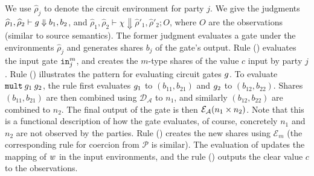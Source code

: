 We use $\widehat\rho_j$ to denote the circuit environment for party $j.$ 
We give the 
judgments $\widehat{\rho}_{1}, \widehat{\rho}_{2} \vdash {g}
\Downarrow b_{1}, b_{2}$, and $\widehat{\rho}_{1}, \widehat{\rho}_{2}
\vdash \chi \Downarrow \widehat{\rho}'_{1}, \widehat{\rho}'_{2}; O$,
where $O$ are the observations (similar to source semantics). 
The former judgment evaluates a gate under the environments
$\widehat{\rho}_j$ and generates shares $b_j$ of the gate's output.
Rule ({}) evaluates the input gate ${\mathtt{in}}^{m}_{j}$, and
creates the $m$-type shares of the value $c$ input by party $j$.
Rule ({}) illustrates the pattern for evaluating circuit
gates ${g}$. To evaluate ${\mathtt{mult}}\:{g}_{1}\:{g}_{2}$, the
rule first evaluates ${g}_{1}$ to $(b_{11}, b_{21})$ and
${g}_{2}$ to $(b_{12}, b_{22})$. Shares $(b_{11}, b_{21})$ are then
combined using $\mathcal{D_{\mathcal{A}}}$ to $n_{1}$, and similarly
$(b_{12}, b_{22})$ are combined to $n_{2}$. The final output of the
 gate is then $\mathcal{E}_{\mathcal{A}}(n_{1} \times n_{2})$. Note
that this is a functional description of how the  gate
evaluates, of course, concretely $n_{1}$ and $n_{2}$ are not observed
by the parties. Rule ({}) creates the new shares using
$\mathcal{E}_m$ (the corresponding rule for coercion from
$\mathcal{P}$ is similar). The evaluation
of  updates the mapping of $w$ in the input environments, and
the rule ({}) outputs the clear value $c$ to the
observations.




